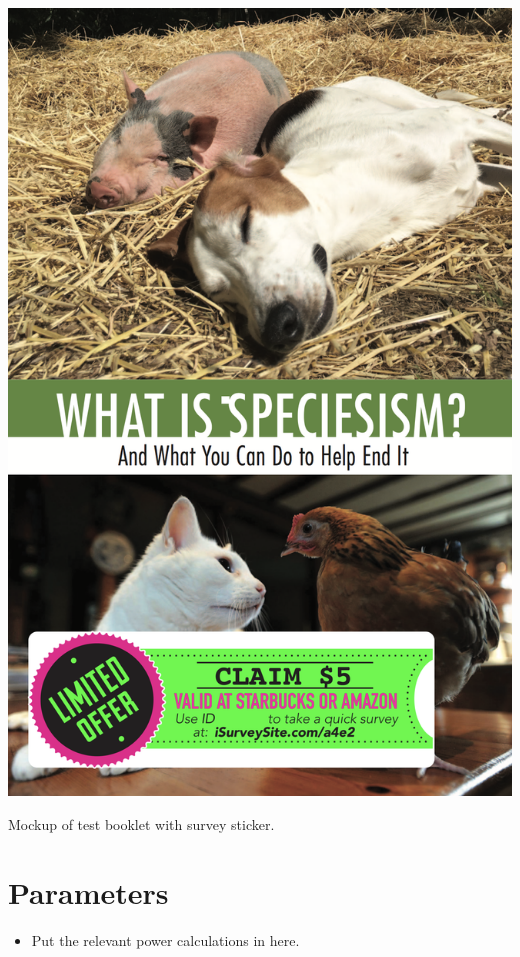 \documentclass{tufte-handout}
\begin{document}
\begin{marginfigure}[-1 in]%
  \includegraphics[width=\textwidth]{les_booklet_mockup.png}
  \caption{Mockup of test booklet with survey sticker.}
  \label{fig:lesbooklet}
\end{marginfigure}

\section{Parameters}

\begin{itemize}
\color{red}
    \item Put the relevant power calculations in here.  	
\end{itemize}
\end{document}
